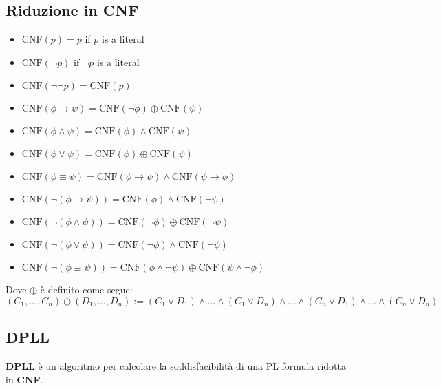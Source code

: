 \subsection{Riduzione in CNF}
\begin{itemize}
\item $\mathrm{CNF}(p) = p$ if $p$ is a literal
\item $\mathrm{CNF}(\lnot p)$ if $\lnot p$ is a literal
\item $\mathrm{CNF}(\lnot \lnot p) = \mathrm{CNF}(p)$
\end{itemize}
\vspace{1em}
\begin{itemize}
\item $\mathrm{CNF}(\phi \to \psi) = \mathrm{CNF}(\lnot \phi) \oplus \mathrm{CNF}(\psi)$
\item $\mathrm{CNF}(\phi \land \psi) = \mathrm{CNF}(\phi) \land \mathrm{CNF}(\psi)$
\item $\mathrm{CNF}(\phi \lor \psi) = \mathrm{CNF}(\phi) \oplus \mathrm{CNF}(\psi)$
\item $\mathrm{CNF}(\phi \equiv \psi) = \mathrm{CNF}(\phi \to \psi) \land\mathrm{CNF}(\psi \to \phi)$
\end{itemize}
\vspace{1em}
\begin{itemize}
\item $\mathrm{CNF}(\lnot (\phi \to \psi)) = \mathrm{CNF}(\phi) \land\mathrm{CNF}(\lnot \psi)$
\item $\mathrm{CNF}(\lnot (\phi \land \psi)) = \mathrm{CNF}(\lnot \phi) \oplus \mathrm{CNF}(\lnot \psi)$
\item $\mathrm{CNF}(\lnot (\phi \lor \psi)) = \mathrm{CNF}(\lnot \phi) \land \mathrm{CNF}(\lnot \psi)$
\item $\mathrm{CNF}(\lnot (\phi \equiv \psi)) = \mathrm{CNF}(\phi \land \lnot \psi) \oplus \mathrm{CNF}(\psi \land \lnot \phi)$
\end{itemize}

Dove $\oplus$ è definito come segue: $$(C_1, ..., C_n) \oplus (D_1, ..., D_n) := (C_1 \lor D_1) \land ... \land (C_1 \lor D_n) \land ... \land (C_n \lor D_1) \land ... \land (C_n \lor D_n)$$

\subsection{DPLL}

\textbf{DPLL} è un algoritmo per calcolare la soddisfacibilità di una PL formula ridotta in \textbf{CNF}.

